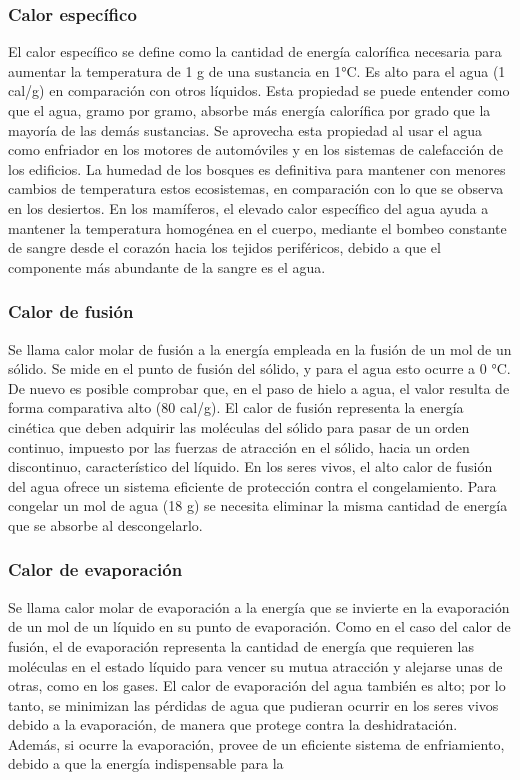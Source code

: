 \subsubsection{Calor específico}

El calor específico se define como la cantidad de energía calorífica necesaria para
aumentar la temperatura de 1 g de una sustancia en 1°C. Es alto para el agua (1 cal/g) en
comparación con otros líquidos. Esta propiedad se puede entender como que el agua,
gramo por gramo, absorbe más energía calorífica por grado que la mayoría de las demás
sustancias. Se aprovecha esta propiedad al usar el agua como enfriador en los motores de
automóviles y en los sistemas de calefacción de los edificios. La humedad de los bosques
es definitiva para mantener con menores cambios de temperatura estos ecosistemas, en
comparación con lo que se observa en los desiertos. En los mamíferos, el elevado calor
específico del agua ayuda a mantener la temperatura homogénea en el cuerpo, mediante
el bombeo constante de sangre desde el corazón hacia los tejidos periféricos, debido a
que el componente más abundante de la sangre es el agua.

\subsubsection{Calor de fusión}

Se llama calor molar de fusión a la energía empleada en la fusión de un mol de un sólido.
Se mide en el punto de fusión del sólido, y para el agua esto ocurre a 0 °C. De nuevo es
posible comprobar que, en el paso de hielo a agua, el valor resulta de forma comparativa
alto (80 cal/g). El calor de fusión representa la energía cinética que deben adquirir las
moléculas del sólido para pasar de un orden continuo, impuesto por las fuerzas de
atracción en el sólido, hacia un orden discontinuo, característico del líquido. En los seres
vivos, el alto calor de fusión del agua ofrece un sistema eficiente de protección contra el
congelamiento. Para congelar un mol de agua (18 g) se necesita eliminar la misma
cantidad de energía que se absorbe al descongelarlo.

\subsubsection{Calor de evaporación}

Se llama calor molar de evaporación a la energía que se invierte en la evaporación de un
mol de un líquido en su punto de evaporación. Como en el caso del calor de fusión, el de
evaporación representa la cantidad de energía que requieren las moléculas en el estado
líquido para vencer su mutua atracción y alejarse unas de otras, como en los gases. El
calor de evaporación del agua también es alto; por lo tanto, se minimizan las pérdidas de
agua que pudieran ocurrir en los seres vivos debido a la evaporación, de manera que
protege contra la deshidratación. Además, si ocurre la evaporación, provee de un
eficiente sistema de enfriamiento, debido a que la energía indispensable para la

